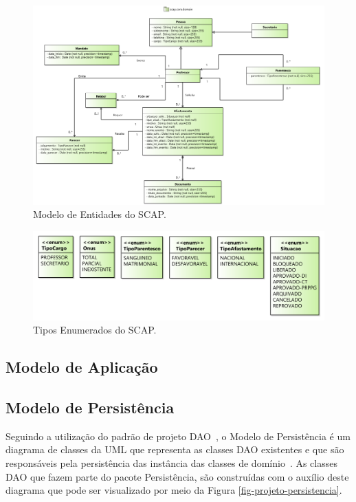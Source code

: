 \begin{figure}[h]
	\centering
	\includegraphics[scale=0.45]{figuras/fig-projeto-entidades} 
	\caption{Modelo de Entidades do SCAP.}
	\label{fig-projeto-entidades}
\end{figure}

\begin{figure}[h]
	\centering
	\includegraphics[scale=0.4]{figuras/fig-projeto-enum} 
	\caption{Tipos Enumerados do SCAP.}
	\label{fig-projeto-enum}
\end{figure}

\subsection{Modelo de Aplicação}
\label{sec-projeto-modelo-aplicacao}

\subsection{Modelo de Persistência}
\label{sec-projeto-modelo-persistencia}

Seguindo a utilização do padrão de projeto DAO~\cite{alur-et-al:bpds03}, o Modelo de Persistência é um diagrama de classes da UML que representa as classes DAO existentes e que são responsáveis pela persistência das instância das classes de domínio~\cite{souza:masterthesis07}. As classes DAO que fazem parte do pacote Persistência, são construídas com o auxílio deste diagrama que pode ser visualizado por meio da Figura \ref{fig-projeto-persistencia}.

